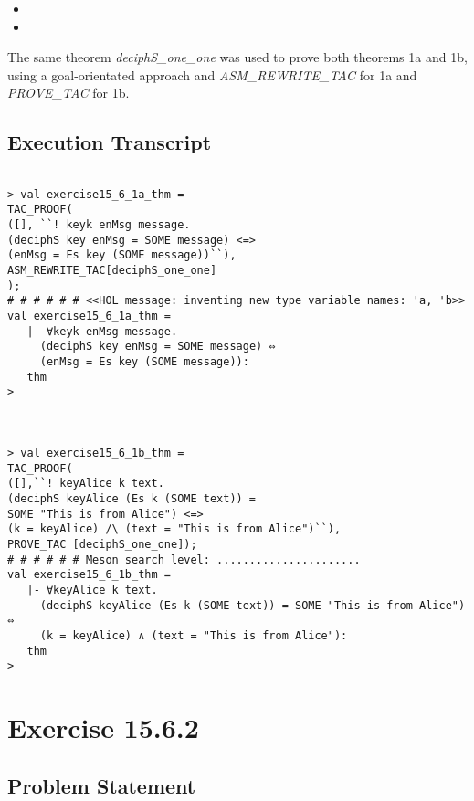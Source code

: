 \documentclass[11pt, twoside]{article}
\begin{document}
\begin{itemize}
  \item {}
  \item {}
\end{itemize}


The same theorem \textit{deciphS_one_one} was used to prove both theorems
1a and 1b, using a goal-orientated approach and \textit{ASM_REWRITE_TAC} for 1a and 
\textit{PROVE_TAC} for 1b.

\subsection{Execution Transcript}
\label{sec:execution-transcript-1}

\lstset{frameround=fftt}
\begin{lstlisting}

> val exercise15_6_1a_thm = 
TAC_PROOF(
([], ``! keyk enMsg message.
(deciphS key enMsg = SOME message) <=>
(enMsg = Es key (SOME message))``),
ASM_REWRITE_TAC[deciphS_one_one]
);
# # # # # # <<HOL message: inventing new type variable names: 'a, 'b>>
val exercise15_6_1a_thm =
   |- ∀keyk enMsg message.
     (deciphS key enMsg = SOME message) ⇔
     (enMsg = Es key (SOME message)):
   thm
> 



> val exercise15_6_1b_thm = 
TAC_PROOF(
([],``! keyAlice k text.
(deciphS keyAlice (Es k (SOME text)) =
SOME "This is from Alice") <=>
(k = keyAlice) /\ (text = "This is from Alice")``),
PROVE_TAC [deciphS_one_one]);
# # # # # # Meson search level: ......................
val exercise15_6_1b_thm =
   |- ∀keyAlice k text.
     (deciphS keyAlice (Es k (SOME text)) = SOME "This is from Alice") ⇔
     (k = keyAlice) ∧ (text = "This is from Alice"):
   thm
> 

\end{lstlisting}

\section{Exercise 15.6.2}
\label{sec:exercise-15.6.2}

\subsection{Problem Statement}
\label{sec:problem-statement-2}
\end{document}
